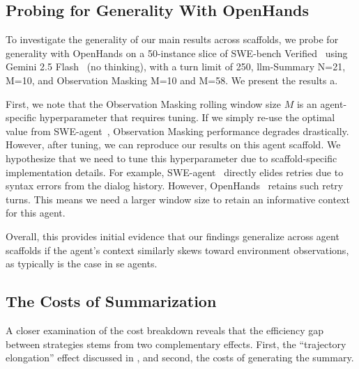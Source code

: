 \documentclass{article}
\begin{document}
\subsection{Probing for Generality With OpenHands}
\label{subsec:openhands}
To investigate the generality of our main results across scaffolds, we probe for generality with OpenHands on a 50-instance slice of SWE-bench Verified~\cite{openai_swe_bench_verified_2024,badertdinov2024scaling} using Gemini 2.5 Flash~\cite{comanici_gemini_2025} (no thinking), with a turn limit of 250, \ac{llm}-Summary N=21, M=10, and Observation Masking M=10 and M=58. We present the results a. 

First, we note that the Observation Masking rolling window size $M$ is an agent-specific hyperparameter that requires tuning. If we simply re-use the optimal value from SWE-agent~\cite{yang_swe-agent_2024}, Observation Masking performance degrades drastically. However, after tuning, we can reproduce our results on this agent scaffold. We hypothesize that we need to tune this hyperparameter due to scaffold-specific implementation details. For example, SWE-agent~\cite{yang_swe-agent_2024} directly elides retries due to syntax errors from the dialog history. However, OpenHands~\cite{wang2025openhands} retains such retry turns. This means we need a larger window size to retain an informative context for this agent. 

Overall, this provides initial evidence that our findings generalize across agent scaffolds if the agent's context similarly skews toward environment observations, as typically is the case in \ac{se} agents.

\subsection{The Costs of Summarization}
\label{subsec:cost-summary}
A closer examination of the cost breakdown reveals that the efficiency gap between strategies stems from two complementary effects. 
First, the ``trajectory elongation'' effect discussed in , and second, the costs of generating the summary.
\end{document}
